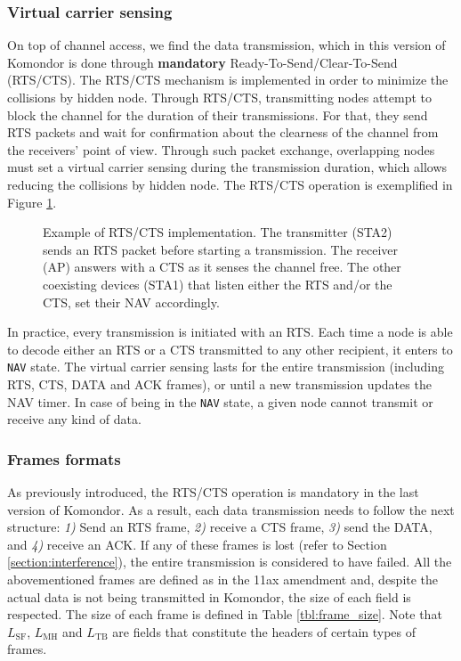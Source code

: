 \documentclass[a4paper]{article}
\begin{document}
	\subsubsection{Virtual carrier sensing}
	On top of channel access, we find the data transmission, which in this version of Komondor is done through \textbf{mandatory} Ready-To-Send/Clear-To-Send (RTS/CTS). The RTS/CTS mechanism is implemented in order to minimize the collisions by hidden node. Through RTS/CTS, transmitting nodes attempt to block the channel for the duration of their transmissions. For that, they send RTS packets and wait for confirmation about the clearness of the channel from the receivers' point of view. Through such packet exchange, overlapping nodes must set a virtual carrier sensing during the transmission duration, which allows reducing the collisions by hidden node. The RTS/CTS operation is exemplified in Figure \ref{fig:rts_cts_mechanism}.
	\begin{figure}[h!]
		\centering
		\caption{Example of RTS/CTS implementation. The transmitter (STA2) sends an RTS packet before starting a transmission. The receiver (AP) answers with a CTS as it senses the channel free. The other coexisting devices (STA1) that listen either the RTS and/or the CTS, set their NAV accordingly.}
		\label{fig:rts_cts_mechanism}
	\end{figure}	
	
	In practice, every transmission is initiated with an RTS. Each time a node is able to decode either an RTS or a CTS transmitted to any other recipient, it enters to \texttt{NAV} state. The virtual carrier sensing lasts for the entire transmission (including RTS, CTS, DATA and ACK frames), or until a new transmission updates the NAV timer. In case of being in the \texttt{NAV} state, a given node cannot transmit or receive any kind of data.
	
	\subsubsection{Frames formats}
	As previously introduced, the RTS/CTS operation is mandatory in the last version of Komondor. As a result, each data transmission needs to follow the next structure: \emph{1)} Send an RTS frame, \emph{2)} receive a CTS frame, \emph{3)} send the DATA, and \emph{4)} receive an ACK. If any of these frames is lost (refer to Section \ref{section:interference}), the entire transmission is considered to have failed. All the abovementioned frames are defined as in the 11ax amendment and, despite the actual data is not being transmitted in Komondor, the size of each field is respected. The size of each frame is defined in Table \ref{tbl:frame_size}. Note that $L_{\text{SF}}$, $L_{\text{MH}}$ and $L_{\text{TB}}$ are fields that constitute the headers of certain types of frames.
	
\end{document}
